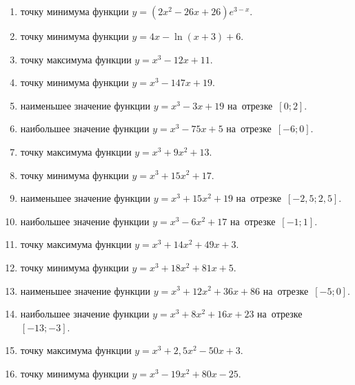 \documentclass[a4paper,10pt]{article}
\begin{document}
\begin{enumerate}
\item {} точку минимума функции $y=\left(2x^2-26x+26\right){{e}^{3-x}}$.

\item {} точку минимума функции $y=4x-\ln \left(x+3\right)+6$.

\item {} точку максимума функции $y=x^3 -12x +11$.

\item {} точку минимума функции $y=x^3 -147x+19$.

\item {} наименьшее значение функции $y=x^3 -3x+19$ на~отрезке~$\left[0;2\right]$.

\item {} наибольшее значение функции $y=x^3 -75x+5$ на~отрезке~$\left[-6;0\right]$.

\item {} точку максимума функции $y=x^3 +9x^2+13$.

\item {} точку минимума функции $y=x^3 +15x^2+17$.

\item {} наименьшее значение функции $y=x^3 +15x^2+19$ на~отрезке~$\left[-2,5;2,5\right]$.

\item {} наибольшее значение функции $y=x^3 -6x^2+17$ на~отрезке~$\left[-1;1\right]$.

\item {} точку максимума функции $y=x^3 +14x^2+49x+3$.

\item {} точку минимума функции $y=x^3 +18x^2+81x+5$.

\item {} наименьшее значение функции $y=x^3 +12x^2+36x+86$ на~отрезке~$\left[-5;0\right]$.

\item {} наибольшее значение функции $y=x^3 +8x^2+16x+23$ на~отрезке~$\left[-13;-3\right]$.

\item {} точку максимума функции $y=x^3 +2,5x^2-50x+3$.

\item {} точку минимума функции $y=x^3 -19x^2+80x-25$.


\end{enumerate}
\end{document}
